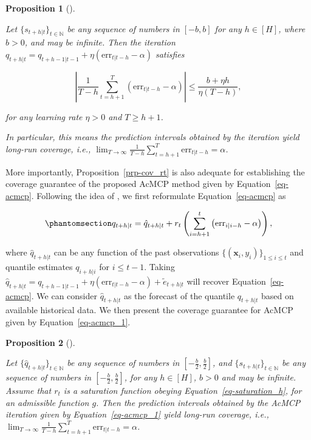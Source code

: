 \documentclass[
  11pt,
  a4paper,
]{article}
\theoremstyle{plain}
\newtheorem{proposition}{Proposition}[section]
\theoremstyle{remark}
\begin{document}
\begin{proposition}[]\protect\hypertarget{prp-cov_qt}{}\label{prp-cov_qt}

Let \(\{s_{t+h|t}\}_{t\in\mathbb{N}}\) be any sequence of numbers in
\([-b, b]\) for any \(h\in[H]\), where \(b>0\), and may be infinite.
Then the iteration
\(q_{t+h|t}=q_{t+h-1|t-1}+\eta \left(\mathrm{err}_{t|t-h}-\alpha\right)\)
satisfies

\[
\left|\frac{1}{T-h}\sum_{t=h+1}^{T}\left(\mathrm{err}_{t|t-h}-\alpha\right)\right| \leq \frac{b + \eta h}{\eta\left(T-h\right)},
\]

for any learning rate \(\eta > 0\) and \(T \geq h+1\).

In particular, this means the prediction intervals obtained by the
iteration yield long-run coverage, i.e.,
\(\lim _{T \rightarrow \infty} \frac{1}{T-h} \sum_{t=h+1}^T \mathrm{err}_{t|t-h} = \alpha\).

\end{proposition}

More importantly, Proposition~\ref{prp-cov_rt} is also adequate for
establishing the coverage guarantee of the proposed AcMCP method given
by Equation~\ref{eq-acmcp}. Following the idea of
\textcite{angelopoulos2024}, we first reformulate
Equation~\ref{eq-acmcp} as

\begin{equation}\phantomsection\label{eq-acmcp_1}{
q_{t+h|t}=\hat{q}_{t+h|t}+r_t\left(\sum_{i=h+1}^t \left(\mathrm{err}_{i|i-h}-\alpha\right)\right),
}\end{equation}

where \(\hat{q}_{t+h|t}\) can be any function of the past observations
\(\{(\bm{x}_i, y_i)\}_{1 \leq i \leq t}\) and quantile estimates
\(q_{i+h|i}\) for \(i \leq t-1\). Taking
\(\hat{q}_{t+h|t}=q_{t+h-1|t-1}+\eta \left(\mathrm{err}_{t|t-h}-\alpha\right)+\tilde{e}_{t+h|t}\)
will recover Equation~\ref{eq-acmcp}. We can consider
\(\hat{q}_{t+h|t}\) as the forecast of the quantile \(q_{t+h|t}\) based
on available historical data. We then present the coverage guarantee for
AcMCP given by Equation~\ref{eq-acmcp_1}.

\begin{proposition}[]\protect\hypertarget{prp-cov_acmcp}{}\label{prp-cov_acmcp}

Let \(\{\hat{q}_{t+h|t}\}_{t\in\mathbb{N}}\) be any sequence of numbers
in \([-\frac{b}{2}, \frac{b}{2}]\), and
\(\{s_{t+h|t}\}_{t\in\mathbb{N}}\) be any sequence of numbers in
\([-\frac{b}{2},\frac{b}{2}]\), for any \(h\in[H]\), \(b>0\) and may be
infinite. Assume that \(r_t\) is a saturation function obeying
Equation~\ref{eq-saturation_h}, for an admissible function \(g\). Then
the prediction intervals obtained by the AcMCP iteration given by
Equation~\ref{eq-acmcp_1} yield long-run coverage, i.e.,
\(\lim _{T \rightarrow \infty} \frac{1}{T-h} \sum_{t=h+1}^T \mathrm{err}_{t|t-h} = \alpha\).

\end{proposition}
\end{document}
